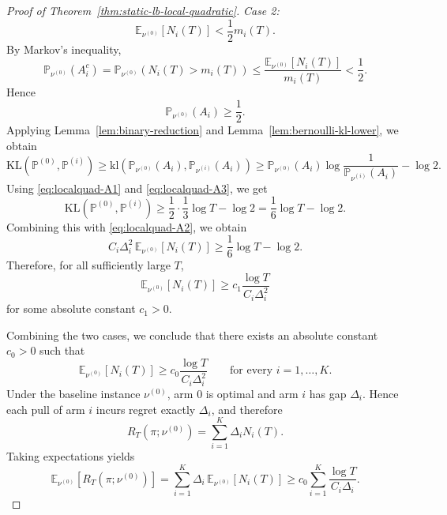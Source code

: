\documentclass[11pt]{article}
\begin{document}
\begin{proof}[Proof of Theorem~\ref{thm:static-lb-local-quadratic}]
\medskip
\noindent
\textit{Case 2:}
\[
\mathbb E_{\nu^{(0)}}[N_i(T)]< \frac12 m_i(T).
\]
By Markov's inequality,
\[
\mathbb P_{\nu^{(0)}}(A_i^c)
=
\mathbb P_{\nu^{(0)}}(N_i(T)>m_i(T))
\le
\frac{\mathbb E_{\nu^{(0)}}[N_i(T)]}{m_i(T)}
<
\frac12.
\]
Hence
\begin{equation}
\mathbb P_{\nu^{(0)}}(A_i)\ge \frac12.
\label{eq:localquad-A3}
\end{equation}
Applying Lemma~\ref{lem:binary-reduction} and
Lemma~\ref{lem:bernoulli-kl-lower}, we obtain
\[
\mathrm{KL}(\mathbb P^{(0)},\mathbb P^{(i)})
\ge
\mathrm{kl}\left(\mathbb P_{\nu^{(0)}}(A_i),\mathbb P_{\nu^{(i)}}(A_i)\right)
\ge
\mathbb P_{\nu^{(0)}}(A_i)\log\frac{1}{\mathbb P_{\nu^{(i)}}(A_i)}-\log 2.
\]
Using \eqref{eq:localquad-A1} and \eqref{eq:localquad-A3}, we get
\[
\mathrm{KL}(\mathbb P^{(0)},\mathbb P^{(i)})
\ge
\frac12\cdot \frac13 \log T-\log 2
=
\frac16\log T-\log 2.
\]
Combining this with \eqref{eq:localquad-A2}, we obtain
\[
C_i\Delta_i^2\,\mathbb E_{\nu^{(0)}}[N_i(T)]
\ge
\frac16\log T-\log 2.
\]
Therefore, for all sufficiently large $T$,
\[
\mathbb E_{\nu^{(0)}}[N_i(T)]
\ge
c_1\frac{\log T}{C_i\Delta_i^2}
\]
for some absolute constant $c_1>0$.

\medskip

Combining the two cases, we conclude that there exists an absolute constant
$c_0>0$ such that
\[
\mathbb E_{\nu^{(0)}}[N_i(T)]
\ge
c_0\frac{\log T}{C_i\Delta_i^2}
\qquad
\text{for every }i=1,\dots,K.
\]
Under the baseline instance $\nu^{(0)}$, arm $0$ is optimal and arm $i$ has
gap $\Delta_i$. Hence each pull of arm $i$ incurs regret exactly $\Delta_i$,
and therefore
\[
R_T(\pi;\nu^{(0)})
=
\sum_{i=1}^K \Delta_i N_i(T).
\]
Taking expectations yields
\[
\mathbb E_{\nu^{(0)}}[R_T(\pi;\nu^{(0)})]
=
\sum_{i=1}^K \Delta_i\,\mathbb E_{\nu^{(0)}}[N_i(T)]
\ge
c_0\sum_{i=1}^K \frac{\log T}{C_i\Delta_i}.
\]
\end{proof}
\end{document}
